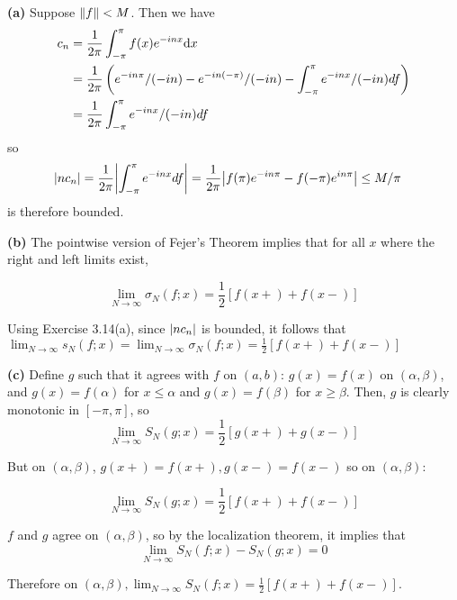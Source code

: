 \documentclass[a4paper, 12pt]{article}
\begin{document}
\begin{solution}
    \textbf{(a)} Suppose $\lVert f\rVert < M$. Then we have \begin{align*}
        c_n &= \frac{1}{2\pi} \int_{-\pi}^{\pi} f(x) e^{-inx} \mathrm{d} x  \\
        &= \frac{1}{2\pi} \left(e^{-i n \pi}/(-in) - e^{-in(-\pi)}/(-in) - \int_{-\pi}^{\pi} e^{-inx}/(-in) df\right) \\
        &= \frac{1}{2\pi} \int_{-\pi}^{\pi} e^{-inx}/(-in) df
    \end{align*}
    so \begin{align*}
        \abs{nc_n} &= \frac{1}{2\pi} \abs*{\int_{-\pi}^{\pi} e^{-inx} df} = \frac{1}{2\pi} \abs*{f(\pi)e^{-in\pi} - f(-\pi)e^{in\pi}} \leq M/\pi
    \end{align*}
    is therefore bounded.

    \textbf{(b)} The pointwise version of Fejer's Theorem implies that for all $x$ where the right and left limits exist,
    
    \begin{equation*}
    \lim_{N \to \infty} \sigma_N(f; x) = \frac{1}{2} [f(x+) + f(x-)]
    \end{equation*}

    Using Exercise 3.14(a), since $\lvert nc_n\rvert$ is bounded, it follows that $\lim_{N \to \infty} s_N(f; x) = \lim_{N \to \infty} \sigma_N(f; x) = \frac{1}{2} [f(x+) + f(x-)]$

    \textbf{(c)} Define $g$ such that it agrees with $f$ on $(a, b)$: $g(x) = f(x)$ on $(\alpha, \beta)$, and $g(x) = f(\alpha)$ for $x \leq \alpha$ and $g(x) = f(\beta)$ for $x \geq \beta$. Then, $g$ is clearly monotonic in $[-\pi, \pi]$, so \begin{equation*}
    \lim_{N \to \infty} S_N(g; x) = \frac{1}{2} [g(x+) + g(x-)]
    \end{equation*}

    But on $(\alpha, \beta)$, $g(x+) = f(x+), g(x-) = f(x-)$ so on $(\alpha, \beta)$:
    
    \begin{equation*}
    \lim_{N \to \infty} S_N(g; x) = \frac{1}{2} [f(x+) + f(x-)]
    \end{equation*}

    $f$ and $g$ agree on $(\alpha, \beta)$, so by the localization theorem, it implies that \begin{equation*}
    \lim_{N \to \infty} S_N(f; x) - S_N(g; x) = 0
    \end{equation*}

    Therefore on $(\alpha, \beta), \lim_{N \to \infty} S_N(f; x) = \frac{1}{2} [f(x+) + f(x-)]$.
\end{solution}
\end{document}
